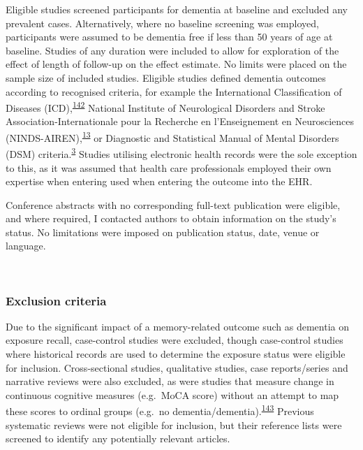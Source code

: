 \documentclass[a4paper, twoside]{templates/ociamthesis}
\begin{document}
Eligible studies screened participants for dementia at baseline and excluded any prevalent cases. Alternatively, where no baseline screening was employed, participants were assumed to be dementia free if less than 50 years of age at baseline. Studies of any duration were included to allow for exploration of the effect of length of follow-up on the effect estimate. No limits were placed on the sample size of included studies. Eligible studies defined dementia outcomes according to recognised criteria, for example the International Classification of Diseases (ICD),\textsuperscript{\protect\hyperlink{ref-organizationwho1993}{142}} National Institute of Neurological Disorders and Stroke Association-Internationale pour la Recherche en l'Enseignement en Neurosciences (NINDS-AIREN),\textsuperscript{\protect\hyperlink{ref-roman1993}{13}} or Diagnostic and Statistical Manual of Mental Disorders (DSM) criteria.\textsuperscript{\protect\hyperlink{ref-edition2013}{3}} Studies utilising electronic health records were the sole exception to this, as it was assumed that health care professionals employed their own expertise when entering used when entering the outcome into the EHR.

Conference abstracts with no corresponding full-text publication were eligible, and where required, I contacted authors to obtain information on the study's status. No limitations were imposed on publication status, date, venue or language.

~

\hypertarget{exclusion-criteria}{%
\subsubsection{Exclusion criteria}\label{exclusion-criteria}}

Due to the significant impact of a memory-related outcome such as dementia on exposure recall, case-control studies were excluded, though case-control studies where historical records are used to determine the exposure status were eligible for inclusion. Cross-sectional studies, qualitative studies, case reports/series and narrative reviews were also excluded, as were studies that measure change in continuous cognitive measures (e.g.~MoCA score) without an attempt to map these scores to ordinal groups (e.g.~no dementia/dementia).\textsuperscript{\protect\hyperlink{ref-tennant2021}{143}} Previous systematic reviews were not eligible for inclusion, but their reference lists were screened to identify any potentially relevant articles.
\end{document}
